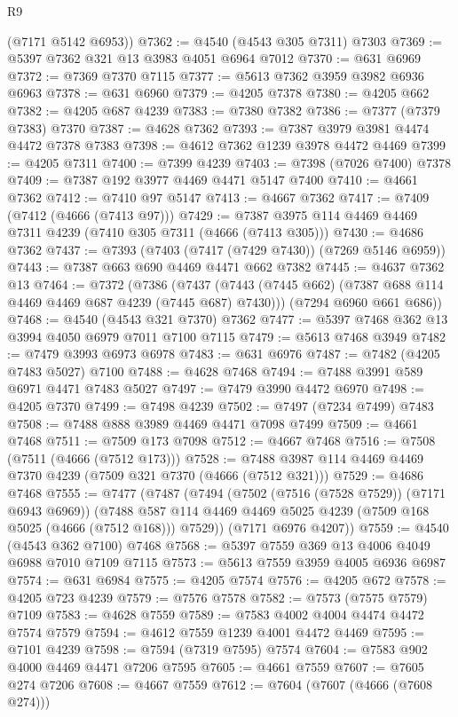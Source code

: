\begin{lexlean}{R9}
\begin{coremodule}
      (@7171 @5142 @6953))
@7362 := @4540 (@4543 @305 @7311) @7303
@7369 := @5397 @7362 @321 @13 @3983 @4051 @6964 @7012
@7370 := @631 @6969
@7372 := @7369 @7370 @7115
@7377 := @5613 @7362 @3959 @3982 @6936 @6963
@7378 := @631 @6960
@7379 := @4205 @7378
@7380 := @4205 @662
@7382 := @4205 @687 @4239
@7383 := @7380 @7382
@7386 := @7377 (@7379 @7383) @7370
@7387 := @4628 @7362
@7393 := @7387 @3979 @3981 @4474 @4472 @7378 @7383
@7398 := @4612 @7362 @1239 @3978 @4472 @4469
@7399 := @4205 @7311
@7400 := @7399 @4239
@7403 := @7398 (@7026 @7400) @7378
@7409 := @7387 @192 @3977 @4469 @4471 @5147 @7400
@7410 := @4661 @7362
@7412 := @7410 @97 @5147
@7413 := @4667 @7362
@7417 := @7409 (@7412 (@4666 (@7413 @97)))
@7429 := @7387 @3975 @114 @4469 @4469 @7311 @4239 (@7410 @305 @7311 (@4666 (@7413 @305)))
@7430 := @4686 @7362
@7437 := @7393 (@7403 (@7417 (@7429 @7430)) (@7269 @5146 @6959))
@7443 := @7387 @663 @690 @4469 @4471 @662 @7382
@7445 := @4637 @7362 @13
@7464 := @7372
    (@7386
      (@7437 (@7443 (@7445 @662) (@7387 @688 @114 @4469 @4469 @687 @4239 (@7445 @687) @7430)))
      (@7294 @6960 @661 @686))
@7468 := @4540 (@4543 @321 @7370) @7362
@7477 := @5397 @7468 @362 @13 @3994 @4050 @6979 @7011 @7100 @7115
@7479 := @5613 @7468 @3949
@7482 := @7479 @3993 @6973 @6978
@7483 := @631 @6976
@7487 := @7482 (@4205 @7483 @5027) @7100
@7488 := @4628 @7468
@7494 := @7488 @3991 @589 @6971 @4471 @7483 @5027
@7497 := @7479 @3990 @4472 @6970
@7498 := @4205 @7370
@7499 := @7498 @4239
@7502 := @7497 (@7234 @7499) @7483
@7508 := @7488 @888 @3989 @4469 @4471 @7098 @7499
@7509 := @4661 @7468
@7511 := @7509 @173 @7098
@7512 := @4667 @7468
@7516 := @7508 (@7511 (@4666 (@7512 @173)))
@7528 := @7488 @3987 @114 @4469 @4469 @7370 @4239 (@7509 @321 @7370 (@4666 (@7512 @321)))
@7529 := @4686 @7468
@7555 := @7477
    (@7487
      (@7494
        (@7502 (@7516 (@7528 @7529)) (@7171 @6943 @6969))
        (@7488 @587 @114 @4469 @4469 @5025 @4239 (@7509 @168 @5025 (@4666 (@7512 @168))) @7529))
      (@7171 @6976 @4207))
@7559 := @4540 (@4543 @362 @7100) @7468
@7568 := @5397 @7559 @369 @13 @4006 @4049 @6988 @7010 @7109 @7115
@7573 := @5613 @7559 @3959 @4005 @6936 @6987
@7574 := @631 @6984
@7575 := @4205 @7574
@7576 := @4205 @672
@7578 := @4205 @723 @4239
@7579 := @7576 @7578
@7582 := @7573 (@7575 @7579) @7109
@7583 := @4628 @7559
@7589 := @7583 @4002 @4004 @4474 @4472 @7574 @7579
@7594 := @4612 @7559 @1239 @4001 @4472 @4469
@7595 := @7101 @4239
@7598 := @7594 (@7319 @7595) @7574
@7604 := @7583 @902 @4000 @4469 @4471 @7206 @7595
@7605 := @4661 @7559
@7607 := @7605 @274 @7206
@7608 := @4667 @7559
@7612 := @7604 (@7607 (@4666 (@7608 @274)))

\end{coremodule}
\end{lexlean}
